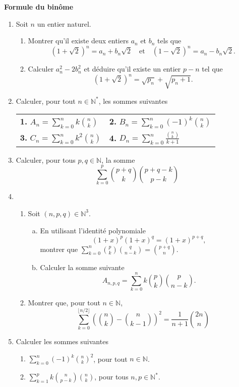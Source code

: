 \documentclass[7pt, twocolumn]{extarticle}
\newcommand{\subsct}[1]{
	\begin{center}
		\large\textbf{#1}
	\end{center}
}
\newcommand{\q}[1]{\textbf{#1.}\quad}
\def\N{\mathbb N}
\begin{document}
	\subsct{Formule du binôme}
	\begin{enumerate}[start=11,label={\bfseries \arabic*}]
		\item Soit $n$ un entier naturel.
		\begin{enumerate}[start=1, label={\bfseries \arabic*.}]
			\item Montrer qu'il existe deux entiers $a_n$ et $b_n$ tels que \[(1+\sqrt{2})^n=a_n+b_n\sqrt{2}\quad \text{et}\quad (1-\sqrt{2})^n=a_n-b_n\sqrt{2}.\]
			\item Calculer $a_n^2-2b_n^2$ et déduire qu'il existe un entier $p-n$ tel que \[(1+\sqrt{2})^n=\sqrt{p_n}+\sqrt{p_n+1}.\]
		\end{enumerate}
		\item Calculer, pour tout $n\in\N^*$, les sommes suivantes\\
		\begin{tabular}{p{4cm} p{4cm}}
			\q{1} \(A_n=\sum_{k=0}^nk\binom nk\) & \q{2} \(B_n=\sum_{k=0}^n(-1)^k\binom nk\)\\
			\q{3} \(C_n=\sum_{k=0}^nk^2\binom nk\) & \q{4} \(D_n=\sum_{k=0}^n\frac{\binom nk}{k+1}\)
		\end{tabular}
		\item Calculer, pour tous $p,q\in\N$, la somme \[\sum_{k=0}^p\binom{p+q}k\binom{p+q-k}{p-k}\]
		\item 
		\begin{enumerate}[start=1, label={\bfseries \arabic*.}]
			\item Soit $(n,p,q)\in\N^3$.
			\begin{enumerate}[(a)]
				\item En utilisant l'identité polynomiale \[(1+x)^p(1+x)^q=(1+x)^{p+q},\]
				montrer que $\sum_{k=0}^n\binom pk\binom q{n-k}=\binom{p+q}n$.
				\item Calculer la somme suivante \[A_{n,p,q}=\sum_{k=0}^nk\binom pk\binom p{n-k}.\]
			\end{enumerate}
			\item Montrer que, pour tout $n\in\N$, \[\sum_{k=0}^{\lfloor n/2\rfloor}\left(\binom nk - \binom n{k-1}\right)^2=\frac1{n+1}\binom{2n}n\]
		\end{enumerate}
		\item Calculer les sommes suivantes
		\begin{enumerate}[start=1, label={\bfseries \arabic*.}]
			\item \(\sum_{k=0}^n(-1)^k\binom nk^2\), pour tout $n\in\N$.
			\item \(\sum_{k=1}^pk\binom n{p-k}\binom nk\), pour tous $n,p\in\N^*$.

\end{enumerate}
\end{enumerate}
\end{document}
